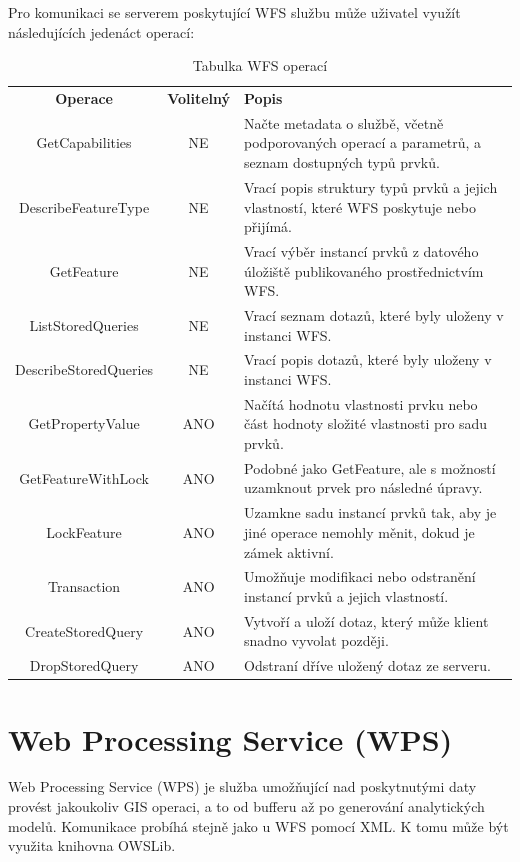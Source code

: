 \documentclass[a4paper,oneside,12pt]{book}
\begin{document}
\hspace{10mm} Pro komunikaci se serverem poskytující WFS službu může uživatel využít následujících jedenáct operací:

\begin{table}[htbp]
  \centering
  \caption{Tabulka WFS operací} 
  \label{tab:WFS}
  \begin{tabular}{|c|c|p{7cm}|}
    \hline
    \textbf{Operace} & \textbf{Volitelný} & \textbf{Popis} \\
    \hhline{=|=|=}
    GetCapabilities & NE & Načte metadata o službě, včetně podporovaných operací a parametrů, a seznam dostupných typů prvků. \\
    \hline
    DescribeFeatureType & NE & Vrací popis struktury typů prvků a jejich vlastností, které WFS poskytuje nebo přijímá. \\
    \hline
    GetFeature & NE & Vrací výběr instancí prvků z datového úložiště publikovaného prostřednictvím WFS. \\
    \hline
    ListStoredQueries & NE & Vrací seznam dotazů, které byly uloženy v instanci WFS. \\
    \hline
    DescribeStoredQueries & NE & Vrací popis dotazů, které byly uloženy v instanci WFS. \\
    \hline
    GetPropertyValue & ANO & Načítá hodnotu vlastnosti prvku nebo část hodnoty složité vlastnosti pro sadu prvků. \\
    \hline
    GetFeatureWithLock & ANO & Podobné jako GetFeature, ale s možností uzamknout prvek pro následné úpravy. \\
    \hline
    LockFeature & ANO & Uzamkne sadu instancí prvků tak, aby je jiné operace nemohly měnit, dokud je zámek aktivní. \\
    \hline
    Transaction & ANO & Umožňuje modifikaci nebo odstranění instancí prvků a jejich vlastností. \\
    \hline
    CreateStoredQuery & ANO & Vytvoří a uloží dotaz, který může klient snadno vyvolat později. \\
    \hline
    DropStoredQuery & ANO & Odstraní dříve uložený dotaz ze serveru. \\
    \hline
  \end{tabular}
\end{table}

\section{Web Processing Service (WPS)} \label{wps}
\hspace{10mm}Web Processing Service (WPS) je služba umožňující nad poskytnutými daty provést jakoukoliv GIS operaci, a to od bufferu až po generování analytických modelů. Komunikace probíhá stejně jako u WFS pomocí XML. K tomu může být využita knihovna OWSLib.
\end{document}

